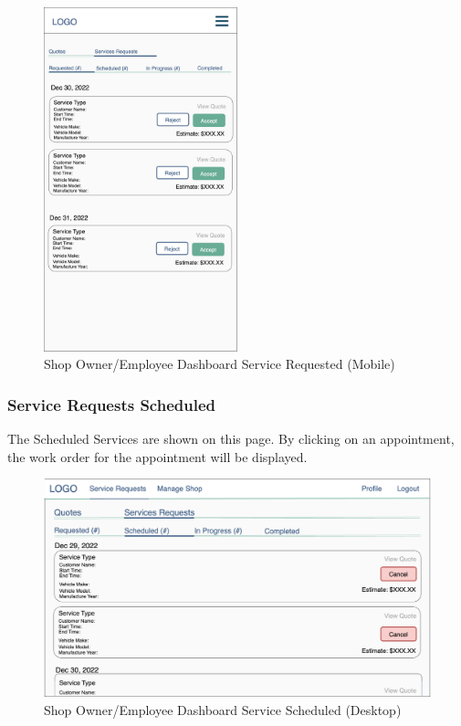 \documentclass[12pt, titlepage]{article}
\begin{document}
\begin{figure}[H]
	\centering
	\includegraphics[width=0.5\textwidth]{mockups/Shop Owner Dashboard (Service Requests - Requested) (Mobile).png}
	\caption{Shop Owner/Employee Dashboard \textemdash{} Service \textemdash{} Requested (Mobile)}
\end{figure}

\subsubsection{Service Requests \textemdash{} Scheduled} The Scheduled Services are shown on this page. By clicking on an appointment, the work
order for the appointment will be displayed.

\begin{figure}[H]
	\centering
	\includegraphics[width=\textwidth]{mockups/Shop Owner Dashboard (Service Requests - Scheduled) (Desktop).png}
	\caption{Shop Owner/Employee Dashboard \textemdash{} Service \textemdash{} Scheduled (Desktop)}
\end{figure}
\end{document}
